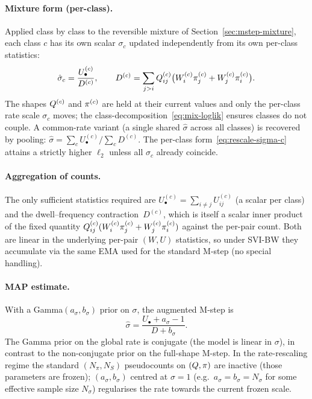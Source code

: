 \paragraph{Mixture form (per-class).}
Applied class by class to the reversible mixture of
Section~\ref{sec:mstep-mixture}, each class $c$ has its own scalar
$\sigma_c$ updated independently from its own per-class statistics:
\begin{equation}\label{eq:rescale-sigma-c}
\hat\sigma_c
= \frac{U^{(c)}_\bullet}{D^{(c)}},
\qquad
D^{(c)} = \sum_{j>i}Q^{(c)}_{ij}
   \bigl(W^{(c)}_i \pi^{(c)}_j + W^{(c)}_j \pi^{(c)}_i\bigr).
\end{equation}
The shapes $Q^{(c)}$ and $\pi^{(c)}$ are held at their current
values and only the per-class rate scale $\sigma_c$ moves; the
class-decomposition~\eqref{eq:mix-loglik} ensures classes do not couple.
A common-rate variant (a single shared $\hat\sigma$ across all classes)
is recovered by pooling: $\hat\sigma = \sum_c U^{(c)}_\bullet
/ \sum_c D^{(c)}$.  The per-class form~\eqref{eq:rescale-sigma-c}
attains a strictly higher $\ell_2$ unless all $\sigma_c$ already coincide.

\paragraph{Aggregation of counts.}
The only sufficient statistics required are
$U^{(c)}_\bullet = \sum_{i\neq j} U^{(c)}_{ij}$ (a scalar per class)
and the dwell--frequency contraction~$D^{(c)}$, which is itself a
scalar inner product of the fixed quantity
$Q^{(c)}_{ij}(W^{(c)}_i \pi^{(c)}_j + W^{(c)}_j \pi^{(c)}_i)$
against the per-pair count.  Both are linear in the underlying
per-pair $(W, U)$ statistics, so under SVI-BW they accumulate via the
same EMA used for the standard M-step (no special handling).

\paragraph{MAP estimate.}
With a Gamma$(a_\sigma, b_\sigma)$ prior on $\sigma$, the augmented
M-step is
\begin{equation}\label{eq:rescale-map}
\hat\sigma = \frac{U_\bullet + a_\sigma - 1}{D + b_\sigma}.
\end{equation}
The Gamma prior on the global rate is conjugate (the model is linear
in $\sigma$), in contrast to the non-conjugate prior on
the full-shape M-step.  In the rate-rescaling regime the standard
$(N_\pi, N_S)$ pseudocounts on $(Q, \pi)$ are inactive (those
parameters are frozen); $(a_\sigma, b_\sigma)$ centred at $\sigma = 1$
(e.g.\ $a_\sigma = b_\sigma = N_\sigma$ for some effective sample size
$N_\sigma$) regularises the rate towards the current frozen scale.

